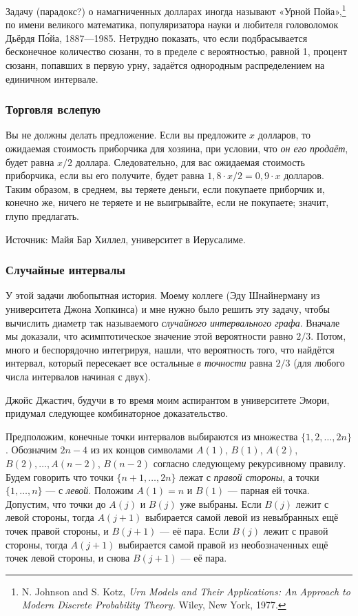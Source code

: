 Задачу (парадокс?) о намагниченных долларах иногда называют «Урной Пойа»,\footnote{N. Johnson and S. Kotz, \emph{Urn Models and Their Applications: An Approach to Modern Discrete Probability Theory.} Wiley, New York, 1977.} по имени великого математика, популяризатора науки и любителя головоломок Дьёрдя П\'{о}йа, 1887---1985.
Нетрудно показать, что если подбрасывается бесконечное количество сюзанн, то в пределе с вероятностью, равной 1, процент сюзанн, попавших в первую урну, задаётся однородным распределением на единичном интервале.

\subsubsection*{Торговля вслепую}%

Вы не должны делать предложение.
Если вы предложите $x$ долларов, то ожидаемая стоимость приборчика для хозяина, при условии, что \emph{он его продаёт}, будет равна $x/2$ доллара.
Следовательно, для вас ожидаемая стоимость приборчика, если вы его получите, будет равна $1{,}8 {\cdot} x/2=0{,}9{\cdot}x$ долларов.
Таким образом, в среднем, вы теряете деньги, если покупаете приборчик и, конечно же, ничего не теряете и не выигрывайте, если не покупаете;
значит, глупо предлагать.
\heart

Источник: Майя Бар Хиллел, университет в Иерусалиме.

\subsubsection*{Случайные интервалы}%

У этой задачи любопытная история.
Моему коллеге (Эду Шнайнерману из университета Джона Хопкинса) и мне нужно было решить эту задачу, чтобы вычислить диаметр так называемого \emph{случайного интервального графа}. 
Вначале мы доказали, что асимптотическое значение этой вероятности равно $2/3$.
Потом, много и беспорядочно интегрируя, нашли, что вероятность того, что найдётся интервал, который пересекает все остальные \emph{в точности} равна $2/3$ (для любого числа интервалов начиная с двух).

Джойс Джастич, %
будучи в то время моим аспирантом в университете Эмори, придумал следующее комбинаторное доказательство.

\medskip

Предположим, конечные точки интервалов выбираются из множества $\{1,2,\dots,2n\}$.
Обозначим $2n-4$ из их концов символами $A(1)$, $B(1)$, $A(2)$, $B(2),\dots, A(n-2)$, $B(n-2)$ согласно следующему рекурсивному правилу.
Будем говорить что точки $\{n+1, \dots , 2n\}$ лежат с \emph{правой стороны}, а точки $\{1, \dots , n\}$ --- с \emph{левой}.
Положим $A(1)=n$ и $B(1)$ --- парная ей точка.
Допустим, что точки до $A(j)$ и $B(j)$ уже выбраны. 
Если $B(j)$ лежит с левой стороны, тогда $A(j+1)$ выбирается самой левой из невыбранных ещё точек правой стороны, и $B(j+1)$ --- её пара.
Если $B(j)$ лежит с правой стороны, тогда $A(j+1)$ выбирается самой правой из необозначенных ещё точек левой стороны, и снова $B(j+1)$ --- её пара.

